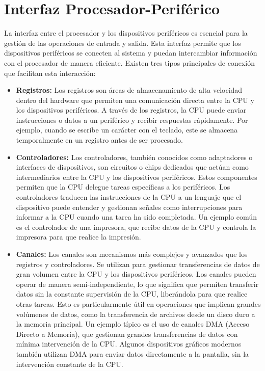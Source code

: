 \section{Interfaz Procesador-Periférico}
La interfaz entre el procesador y los dispositivos periféricos es esencial para la gestión de las operaciones de entrada y salida. Esta interfaz permite que los dispositivos periféricos se conecten al sistema y puedan intercambiar información con el procesador de manera eficiente. Existen tres tipos principales de conexión que facilitan esta interacción:

\begin{tcolorbox}[title= Tipos de conexión]
	\begin{itemize}
		
		
		\item \textbf{Registros:}
	Los registros son áreas de almacenamiento de alta velocidad dentro del hardware que permiten una comunicación directa entre la CPU y los dispositivos periféricos. A través de los registros, la CPU puede enviar instrucciones o datos a un periférico y recibir respuestas rápidamente. Por ejemplo, cuando se escribe un carácter con el teclado, este se almacena temporalmente en un registro antes de ser procesado.
	\item \textbf{Controladores:}
	Los controladores, también conocidos como adaptadores o interfaces de dispositivos, son circuitos o chips dedicados que actúan como intermediarios entre la CPU y los dispositivos periféricos. Estos componentes permiten que la CPU delegue tareas específicas a los periféricos. Los controladores traducen las instrucciones de la CPU a un lenguaje que el dispositivo puede entender y gestionan señales como interrupciones para informar a la CPU cuando una tarea ha sido completada. Un ejemplo común es el controlador de una impresora, que recibe datos de la CPU y controla la impresora para que realice la impresión.
	\item \textbf{Canales:}
	Los canales son mecanismos más complejos y avanzados que los registros y controladores. Se utilizan para gestionar transferencias de datos de gran volumen entre la CPU y los dispositivos periféricos. Los canales pueden operar de manera semi-independiente, lo que significa que permiten transferir datos sin la constante supervisión de la CPU, liberándola para que realice otras tareas. Esto es particularmente útil en operaciones que implican grandes volúmenes de datos, como la transferencia de archivos desde un disco duro a la memoria principal. Un ejemplo típico es el uso de canales DMA (Acceso Directo a Memoria), que gestionan grandes transferencias de datos con mínima intervención de la CPU. Algunos dispositivos gráficos modernos también utilizan DMA para enviar datos directamente a la pantalla, sin la intervención constante de la CPU.
	
		
	\end{itemize}
\end{tcolorbox}



